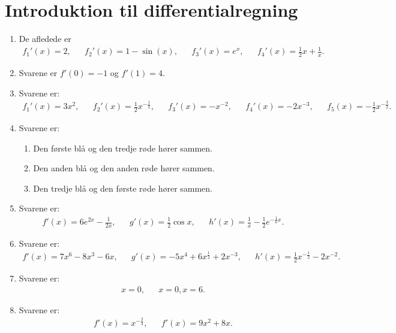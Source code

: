 \section{Introduktion til differentialregning}
\begin{enumerate}
	\item De afledede er
	\begin{align*}
	f_1'(x)=2,&& f_2'(x)=1-\sin(x),&& f_3'(x)=e^x,&&f_4'(x)=\frac{1}{2}x+\frac{1}{x}.
	\end{align*}
	
	
	\item Svarene er $f'(0)=-1$ og $f'(1)=4$.

	\item Svarene er:
	\begin{align*}
	f_1'(x)=3x^2,&& f_2'(x)=\frac{1}{2}x^{-\frac{1}{2}},&& f_3'(x)=-x^{-2},&&f_4'(x)=-2x^{-3},&&f_5(x)=-\frac{1}{2}x^{-\frac{3}{2}}.
	\end{align*}
	\item  Svarene er:
\begin{enumerate}
	\item Den første blå og den tredje røde hører sammen.
	\item Den anden blå og den anden røde hører sammen.
	\item Den tredje blå og den første røde hører sammen.
	\end{enumerate}
	
	\item Svarene er:
	\begin{align*}
	f'(x)=6e^{2x}-\frac{1}{2x},&& g'(x)=\frac{1}{2}\cos x,&& h'(x)=\frac{1}{x}-\frac{1}{2}e^{-\frac{1}{6}x}.
	\end{align*}
	
	\item Svarene er:
	\begin{align*}
	f'(x)=7x^6-8x^3-6x,&&g'(x)=-5x^4+6x^{\frac{1}{2}}+2x^{-3},&&h'(x)=\frac{1}{2}x^{-\frac{1}{2}}-2x^{-2}.
	\end{align*}
	
	
	\item Svarene er:
	\begin{align*}
	x=0,&& x=0,x=6. 
	\end{align*}
	
	\item Svarene er:
	\begin{align*}
	f'(x)=x^{-\frac{2}{3}},&& f'(x)=9x^2+8x.
	\end{align*}
		


\end{enumerate}
